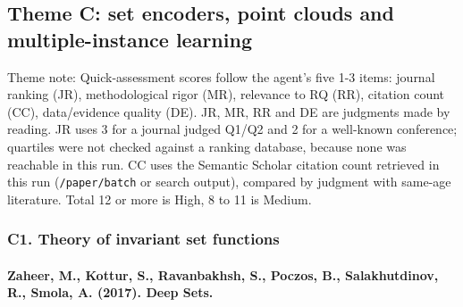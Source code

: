 \documentclass[journal,onecolumn]{IEEEtran}
\begin{document}
\subsection{Theme C: set encoders, point clouds and multiple-instance learning}

Theme note: Quick-assessment scores follow the agent's five 1-3 items: journal ranking (JR), methodological rigor (MR), relevance to RQ (RR), citation count (CC), data/evidence quality (DE). JR, MR, RR and DE are judgments made by reading. JR uses 3 for a journal judged Q1/Q2 and 2 for a well-known conference; quartiles were not checked against a ranking database, because none was reachable in this run. CC uses the Semantic Scholar citation count retrieved in this run (\texttt{/paper/batch} or search output), compared by judgment with same-age literature. Total 12 or more is High, 8 to 11 is Medium.

\subsubsection{C1. Theory of invariant set functions}

\paragraph{Zaheer, M., Kottur, S., Ravanbakhsh, S., Poczos, B., Salakhutdinov, R., Smola, A. (2017). Deep Sets.~\cite{Zaheer2017DeepSets}}\mbox{}
\end{document}

